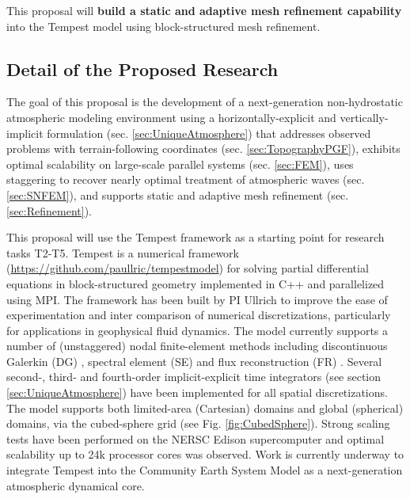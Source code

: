 \documentclass[11pt]{article}
\begin{document}
This proposal will \textbf{build a static and adaptive mesh refinement capability} into the Tempest model using block-structured mesh refinement.


\subsection{Detail of the Proposed Research} \label{sec:Research}

The goal of this proposal is the development of a next-generation non-hydrostatic atmospheric modeling environment using a horizontally-explicit and vertically-implicit formulation (sec. \ref{sec:UniqueAtmosphere}) that addresses observed problems with terrain-following coordinates (sec. \ref{sec:TopographyPGF}), exhibits optimal scalability on large-scale parallel systems (sec. \ref{sec:FEM}), uses staggering to recover nearly optimal treatment of atmospheric waves (sec. \ref{sec:SNFEM}), and supports static and adaptive mesh refinement (sec. \ref{sec:Refinement}).


This proposal will use the Tempest framework \cite{ullrich2014global} as a starting point for research tasks T2-T5.  Tempest is a numerical framework (\url{https://github.com/paullric/tempestmodel}) \cite{ullrich2014global} for solving partial differential equations in block-structured geometry implemented in C++ and parallelized using MPI.  The framework has been built by PI Ullrich to improve the ease of experimentation and inter comparison of numerical discretizations, particularly for applications in geophysical fluid dynamics.  The model currently supports a number of (unstaggered) nodal finite-element methods including discontinuous Galerkin (DG) \cite{cockburn2000development}, spectral element (SE) \cite{maday1989spectral} and flux reconstruction (FR) \cite{huynh2007flux}.  Several second-, third- and fourth-order implicit-explicit time integrators (see section \ref{sec:UniqueAtmosphere}) have been implemented for all spatial discretizations.  The model supports both limited-area (Cartesian) domains and global (spherical) domains, via the cubed-sphere grid (see Fig. \ref{fig:CubedSphere}).  Strong scaling tests have been performed on the NERSC Edison supercomputer and optimal scalability up to 24k processor cores was observed.  Work is currently underway to integrate Tempest into the Community Earth System Model \cite{JWHetal2013BAMS} as a next-generation atmospheric dynamical core.
\end{document}

